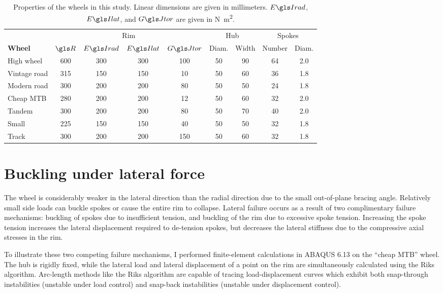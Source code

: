\documentclass[\rootdir/thesis.tex]{subfiles}
\begin{document}
\begin{table}
\caption{Properties of the wheels in this study. Linear dimensions are given in millimeters. $\EIr$, $\EIl$, and $\GJ$ are given in \si{N.m^2}.}
\label{tab:buckling_ext_wheel_props}
\begin{tabular}{l|cccc|cc|cc}
\hline
&\multicolumn{4}{c|}{Rim} & \multicolumn{2}{c|}{Hub} & \multicolumn{2}{c}{Spokes}\\
\bf{Wheel} & $\R$ & $\EIr$ & $\EIl$ & $\GJ$ & Diam. & Width & Number & Diam.\\
\hline
High wheel   & 600 & 300 & 300 & 100 & 50 & 90 & 64 & 2.0\\
Vintage road & 315 & 150 & 150 & 10  & 50 & 60 & 36 & 1.8\\
Modern road  & 300 & 200 & 200 & 80  & 50 & 50 & 24 & 1.8\\
Cheap MTB    & 280 & 200 & 200 & 12  & 50 & 60 & 32 & 2.0\\
Tandem       & 300 & 200 & 200 & 80  & 50 & 70 & 40 & 2.0\\
Small        & 225 & 150 & 150 & 40  & 50 & 50 & 32 & 1.8\\
Track        & 300 & 200 & 200 & 150 & 50 & 60 & 32 & 1.8\\
\hline
\end{tabular}
\end{table}


\section{Buckling under lateral force}
\label{sec:buckling_lat_force}

The wheel is considerably weaker in the lateral direction than the radial direction due to the small out-of-plane bracing angle. Relatively small side loads can buckle spokes or cause the entire rim to collapse. Lateral failure occurs as a result of two complimentary failure mechanisms: buckling of spokes due to insufficient tension, and buckling of the rim due to excessive spoke tension. Increasing the spoke tension increases the lateral displacement required to de-tension spokes, but decreases the lateral stiffness due to the compressive axial stresses in the rim.

To illustrate these two competing failure mechanisms, I performed finite-element calculations in ABAQUS 6.13 on the ``cheap MTB'' wheel. The hub is rigidly fixed, while the lateral load and lateral displacement of a point on the rim are simultaneously calculated using the Riks algorithm. Arc-length methods like the Riks algorithm are capable of tracing load-displacement curves which exhibit both snap-through instabilities (unstable under load control) and snap-back instabilities (unstable under displacement control).
\end{document}
